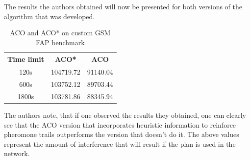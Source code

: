 The results the authors obtained will now be presented for both versions of the algorithm that was developed\cite{ACOvsEA}.

\begin{table}
\centering
	\begin{tabular}{| c | c | c |}
	\hline
	Time limit & ACO* & ACO \\ \hline
	120s & 104719.72 & 91140.04 \\ \hline
	600s & 103752.12 & 89703.44 \\ \hline
	1800s & 103781.86 & 88345.94 \\ \hline
	\end{tabular}
\caption{ACO and ACO* on custom GSM FAP benchmark\cite{ACOvsEA}}
\end{table}

The authors note, that if one observed the results they obtained, one can clearly see that the ACO version that incorporates heuristic information to reinforce pheromone trails outperforms the version that doesn't do it\cite{ACOvsEA}. The above values represent the amount of interference that will result if the plan is used in the network\cite{ACOvsEA}.
\pagebreak
